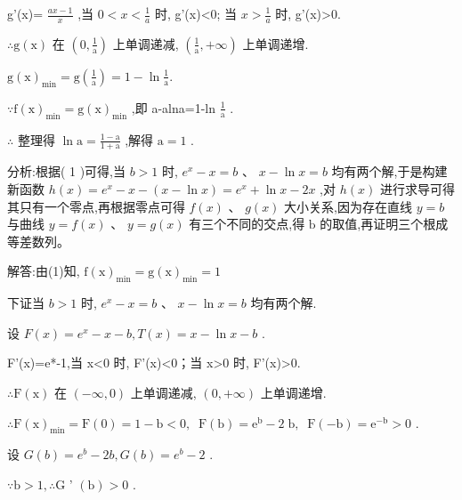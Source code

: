 \documentclass[10pt]{article}
\begin{document}
g'(x)= \(\frac{{ax} - 1}{x}\) ,当 \(0 < x < \frac{1}{a}\) 时, g'(x)<0; 当 \(x > \frac{1}{a}\) 时, g’(x)>0.

\(\therefore \mathrm{g}\left( \mathrm{x}\right)\) 在 \(\left( {0,\frac{1}{\mathrm{a}}}\right)\) 上单调递减, \(\left( {\frac{1}{\mathrm{a}}, + \infty }\right)\) 上单调递增.

\(\mathrm{g}{\left( \mathrm{x}\right) }_{\min } = \mathrm{g}\left( \frac{1}{\mathrm{a}}\right)  = 1 - \ln \frac{1}{\mathrm{a}}.\)

\(\because \mathrm{f}{\left( \mathrm{x}\right) }_{\min } = \mathrm{g}{\left( \mathrm{x}\right) }_{\min }\) ,即 a-alna=1-ln \(\frac{1}{\mathrm{a}}\) .

\(\therefore\) 整理得 \(\ln \mathrm{a} = \frac{1 - \mathrm{a}}{1 + \mathrm{a}}\) ,解得 \(\mathrm{a} = 1\) .

分析:根据( 1 )可得,当 \(b > 1\) 时, \({e}^{x} - x = b\) 、 \(x - \ln x = b\) 均有两个解,于是构建新函数 \(h\left( x\right)  = {e}^{x} - x - \left( {x - \ln x}\right)  = {e}^{x} + \ln x - {2x}\) ,对 \(h\left( x\right)\) 进行求导可得其只有一个零点,再根据零点可得 \(f\left( x\right) \text{ 、 }g\left( x\right)\) 大小关系,因为存在直线 \(y = b\) 与曲线 \(y = f\left( x\right) \text{ 、 }y = g\left( x\right)\) 有三个不同的交点,得 \(\mathrm{b}\) 的取值,再证明三个根成等差数列。

解答:由(1)知, \(\mathrm{f}{\left( \mathrm{x}\right) }_{\min } = \mathrm{g}{\left( \mathrm{x}\right) }_{\min } = 1\)

下证当 \(b > 1\) 时, \({e}^{x} - x = b\text{ 、 }x - \ln x = b\) 均有两个解.

设 \(F\left( x\right)  = {e}^{x} - x - b,T\left( x\right)  = x - \ln x - b\) .

F'(x)=e*-1,当 x<0 时, F'(x)<0；当 x>0 时, F'(x)>0.

\(\therefore \mathrm{F}\left( \mathrm{x}\right)\) 在 \(\left( {-\infty ,0}\right)\) 上单调递减, \(\left( {0, + \infty }\right)\) 上单调递增.

\(\therefore \mathrm{F}{\left( \mathrm{x}\right) }_{\min } = \mathrm{F}\left( 0\right)  = 1 - \mathrm{b} < 0,\;\mathrm{\;F}\left( \mathrm{b}\right)  = {\mathrm{e}}^{\mathrm{b}} - 2\mathrm{\;b},\;\mathrm{\;F}\left( {-\mathrm{b}}\right)  = {\mathrm{e}}^{-\mathrm{b}} > 0\) .

设 \(G\left( b\right)  = {e}^{b} - {2b},G\left( b\right)  = {e}^{b} - 2\) .

\(\because \mathrm{b} > 1,\therefore \mathrm{G}\) ’ \(\left( \mathrm{b}\right)  > 0\) .
\end{document}

